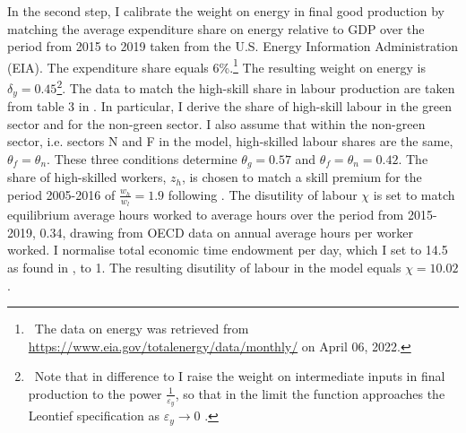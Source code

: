 In the second step, I calibrate the weight on energy in final good production by matching the average expenditure share on energy relative to GDP over the period from 2015 to 2019 taken from the U.S. Energy Information Administration (EIA). The expenditure share equals 6\%.\footnote{\ The data on energy was retrieved from \url{https://www.eia.gov/totalenergy/data/monthly/}
 on April 06, 2022.} The resulting weight on energy is $\delta_y=0.45$\footnote{\ Note that in difference to \cite{Fried2018ClimateAnalysis} I raise the weight on intermediate inputs in final production to the power $\frac{1}{\varepsilon_y}$, so that in the limit the function approaches the Leontief specification as $\varepsilon_y\rightarrow 0$ \citep{Herrendorf2014GrowthTransformation}.}. The data to match the high-skill share in labour production are taken from table 3 in \cite{Consoli2016DoCapital}. In particular, I derive the share of high-skill labour in the green sector and for the non-green sector. I also assume that within the non-green sector, i.e. sectors N and F in the model, high-skilled labour shares are the same, $\theta_f=\theta_n$.  These three conditions determine $\theta_g=0.57$ and $\theta_f=\theta_n=0.42$. The share of high-skilled workers, $z_h$, is chosen to match a skill premium for the period 2005-2016 of $\frac{w_h}{w_l}=1.9$ following \cite{Slavik2020WagePremium}. The disutility of labour $\chi$ is set to match equilibrium average hours worked to average hours over the period from 2015-2019, 0.34, drawing from OECD data on annual average hours per worker worked. I normalise total economic time endowment per day, which I set to 14.5 as found in \cite{Jones1993OptimalGrowth}, to 1. The resulting disutility of labour in the model equals $\chi=10.02$. 

